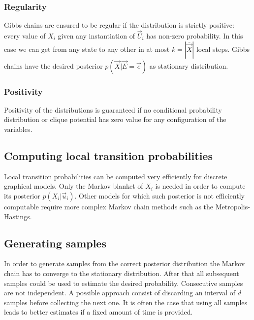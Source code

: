 		\subsubsection{Regularity}
		Gibbs chains are ensured to be regular if the distribution is strictly positive: every value of $X_i$ given any instantiation of $\vec{U}_i$ has non-zero probability.
		In this case we can get from any state to any other in at most $k=|\bar{\vec{X}}|$ local steps.
		Gibbs chains have the desired posterior $p(\vec{X}|\vec{E}=\vec{e})$ as stationary distribution.

		\subsubsection{Positivity}
		Positivity of the distributions is guaranteed if no conditional probability distribution or clique potential has zero value for any configuration of the variables.

	\subsection{Computing local transition probabilities}
	Local transition probabilities can be computed very efficiently for discrete graphical models.
	Only the Markov blanket of $X_i$ is needed in order to compute its posterior $p(X_i|\vec{u}_i)$.
	Other models for which such posterior is not efficiently computable require more complex Markov chain methods such as the Metropolis-Hastings.

	\subsection{Generating samples}
	In order to generate samples from the correct posterior distribution the Markov chain has to converge to the stationary distribution.
	After that all subsequent samples could be used to estimate the desired probability.
	Consecutive samples are not independent.
	A possible approach consist of discarding an interval of $d$ samples before collecting the next one.
	It is often the case that using all samples leads to better estimates if a fixed amount of time is provided.
